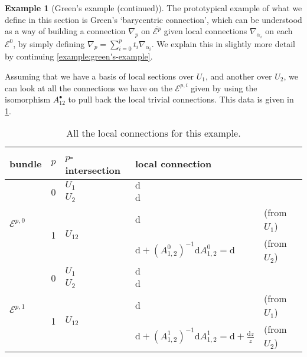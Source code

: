 \documentclass[11pt,fleqn]{article}
\theoremstyle{plain}
\theoremstyle{definition}
\newtheorem{example}[theorem]{Example}
\theoremstyle{remark}
\numberwithin{equation}{theorem}
\renewcommand{\d}{\mathrm{d}}
\begin{document}
        \begin{example}[Green's example (continued)]\label{example:green's-example-cont}
            The prototypical example of what we define in this section is Green's `barycentric connection', which can be understood as a way of building a connection $\nabla_p$ on $\overline{\mathcal{E}^p}$ given local connections $\nabla_{\alpha_i}$ on each $\mathcal{E}^0$, by simply defining $\nabla_p=\sum_{i=0}^p t_i\nabla_{\alpha_i}$.
            We explain this in slightly more detail by continuing \cref{example:green's-example}.

            \medskip

            Assuming that we have a basis of local sections over $U_1$, and another over $U_2$, we can look at all the connections we have on the $\mathcal{E}^{p,i}$ given by using the isomorphism $A_{12}^\bullet$ to pull back the local trivial connections.
            This data is given in \cref{table:pullback-connections-in-green's-example}.
            
            \begin{table}[ht]
                \centering
                \begin{tabular}{lllll}
                    bundle & $p$ & $p$-intersection & local connection &\\
                    \toprule
                    \multirow{4}{*}{$\mathcal{E}^{p,0}$} & \multirow{2}{*}{0} & $U_1$ & $\d$\\
                    & & $U_2$ & $\d$\\
                    & \multirow{2}{*}{1} & \multirow{2}{*}{$U_{12}$} & $\d$ & (from $U_1$)\\
                    & & & $\d+(A_{1,2}^0)^{-1}\d A_{1,2}^0=\d$ & (from $U_2$)\\
                    \midrule
                    \multirow{4}{*}{$\mathcal{E}^{p,1}$} & \multirow{2}{*}{0} & $U_1$ & $\d$\\
                    & & $U_2$ & $\d$\\
                    & \multirow{2}{*}{1} & \multirow{2}{*}{$U_{12}$} & $\d$ & (from $U_1$)\\
                    & & & $\d+(A_{1,2}^1)^{-1}\d A_{1,2}^1=\d+\frac{\d z}{z}$ & (from $U_2$)\\
                    \bottomrule
                \end{tabular}
                \caption{All the local connections for this example.}\label{table:pullback-connections-in-green's-example}
            \end{table}


\end{example}
\end{document}
